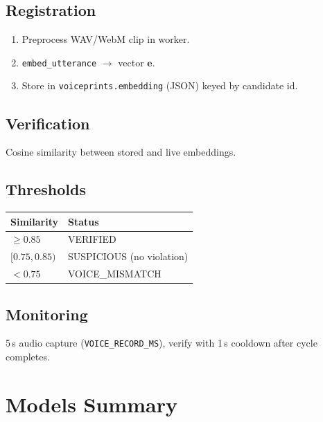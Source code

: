 \documentclass[11pt,a4paper]{report}
\begin{document}
\subsection{Registration}
\begin{enumerate}
  \item Preprocess WAV/WebM clip in worker.
  \item \texttt{embed\_utterance} $\rightarrow$ vector $\mathbf{e}$.
  \item Store in \texttt{voiceprints.embedding} (JSON) keyed by candidate id.
\end{enumerate}

\subsection{Verification}
Cosine similarity between stored and live embeddings.

\subsection{Thresholds}
\begin{table}[H]
\centering
\begin{tabular}{@{}ll@{}}
\toprule
Similarity & Status \\
\midrule
$\geq 0.85$ & VERIFIED \\
$[0.75, 0.85)$ & SUSPICIOUS (no violation) \\
$< 0.75$ & VOICE\_MISMATCH \\
\bottomrule
\end{tabular}
\end{table}

\subsection{Monitoring}
5\,s audio capture (\texttt{VOICE\_RECORD\_MS}), verify with 1\,s cooldown after cycle completes.

\section{Models Summary}
\end{document}
